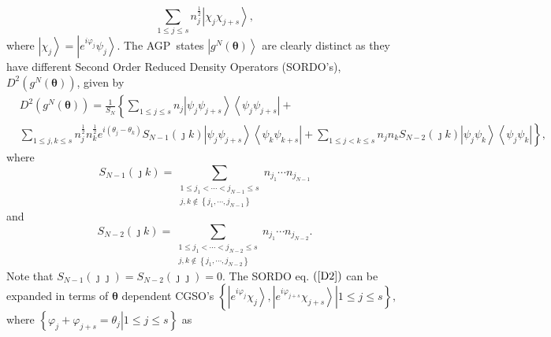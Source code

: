 \documentclass[aps,preprint]{revtex4}%
\begin{document}
\begin{equation}
\sum_{1\leq j\leq s}n_{j}^{\frac{1}{2}}\left\vert \chi_{j}\chi_{j+s}%
\right\rangle ,
\end{equation}
where $\left\vert \chi_{j}\right\rangle =\left\vert e^{i\varphi_{j}}\psi
_{j}\right\rangle $. The AGP\ states $\left\vert g^{N}\left(  \mathbf{\theta
}\right)  \right\rangle $ are clearly distinct as they have different Second
Order Reduced Density Operators (SORDO's), $D^{2}\left(  g^{N}\left(
\mathbf{\theta}\right)  \right)  $, given by \cite{Coleman}
\begin{align}
&  D^{2}\left(  g^{N}\left(  \mathbf{\theta}\right)  \right)  =\frac{1}{S_{N}%
}\left\{  \sum_{1\leq j\leq s}n_{j}\left\vert \psi_{j}\psi_{j+s}\right\rangle
\left\langle \psi_{j}\psi_{j+s}\right\vert \right.  +\nonumber\\
&  \left.  \sum_{1\leq j,k\leq s}n_{j}^{\frac{1}{2}}n_{k}^{\frac{1}{2}%
}e^{i\left(  \theta_{j}-\theta_{k}\right)  }S_{N-1}\left(  \jmath k\right)
\left\vert \psi_{j}\psi_{j+s}\right\rangle \left\langle \psi_{k}\psi
_{k+s}\right\vert +\sum_{1\leq j<k\leq s}n_{j}n_{k}S_{N-2}\left(  \jmath
k\right)  \left\vert \psi_{j}\psi_{k}\right\rangle \left\langle \psi_{j}%
\psi_{k}\right\vert \right\}  , \label{D2}%
\end{align}
where
\begin{equation}
S_{N-1}\left(  \jmath k\right)  =\sum_{\substack{1\leq j_{1}<\cdots
<j_{N-1}\leq s\\j,k\notin\left\{  j_{1},\cdots,j_{N-1}\right\}  }}n_{j_{1}%
}\cdots n_{j_{N-1}}%
\end{equation}
and
\begin{equation}
S_{N-2}\left(  \jmath k\right)  =\sum_{\substack{1\leq j_{1}<\cdots
<j_{N-2}\leq s\\j,k\notin\left\{  j_{1},\cdots,j_{N-2}\right\}  }}n_{j_{1}%
}\cdots n_{j_{N-2}}.
\end{equation}
Note that $S_{N-1}\left(  \jmath\jmath\right)  =S_{N-2}\left(  \jmath
\jmath\right)  =0.$ The SORDO eq. $\left(  \ref{D2}\right)  $ can be expanded
in terms of $\mathbf{\theta}$ dependent CGSO's $\left\{  \left.  \left\vert
e^{i\varphi_{j}}\chi_{j}\right\rangle ,\left\vert e^{i\varphi_{j+s}}\chi
_{j+s}\right\rangle \right\vert 1\leq j\leq s\right\}  ,$ where $\left\{
\left.  \varphi_{j}+\varphi_{j+s}=\theta_{j}\right\vert 1\leq j\leq s\right\}
$ as
\end{document}
